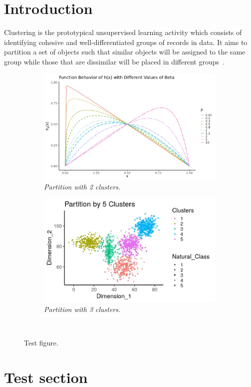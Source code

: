 
\section{Introduction}
Clustering is the prototypical unsupervised learning activity which consists of identifying cohesive and well-differentiated groups of records in data. It aims to partition a set of objects such that similar objects will be assigned to the same group while those that are dissimilar will be placed in different groups~\cite{jain2010data}. 

\lipsum[2-4]
\lipsum[2-4]

\lipsum[2-4]
\begin{figure}[!ht]
\centering
\begin{subfigure}[b]{0.45\textwidth}
                \includegraphics[width=\textwidth]{graph/betaFuncBehv.jpeg}
                \caption{\textit{Partition with 2 clusters.}}
                \label{fig:prt5cls_2clst}
\end{subfigure}
\begin{subfigure}[b]{0.45\textwidth}
                \includegraphics[width=\textwidth]{graph/prt5cls_5clst.jpeg}
                \caption{\textit{Partition with 3 clusters.}}
                \label{fig:prt5cls_3clst}
\end{subfigure}\\
\caption{Test figure.}
\label{fig:prt5cls}
\end{figure}

\section{Test section}
\lipsum[2-4]

\lipsum[2-4]

\lipsum[2-4]


 